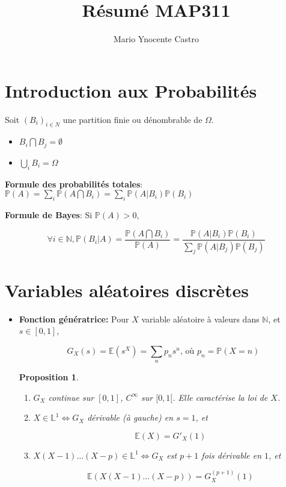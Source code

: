 \documentclass[10pt,a4paper,oneside]{article}
\newtheorem{proposition}{Proposition}
\begin{document}
\title{Résumé MAP311}
\author{Mario Ynocente Castro}

\maketitle

\section{Introduction aux Probabilités}

Soit $(B_i)_{i \in N}$ une partition finie ou dénombrable de $\Omega$.

\begin{itemize}
\item
$B_i \bigcap B_j = \emptyset$
\item
$\bigcup_i B_i = \Omega$
\end{itemize}

\textbf{Formule des probabilités totales}: $\mathbb{P}(A) = \sum_i \mathbb{P}(A \bigcap B_i) = \sum_i \mathbb{P}(A|B_i) \mathbb{P}(B_i)$

\textbf{Formule de Bayes}: Si $\mathbb{P}(A) > 0$,

\[ \forall i \in \mathbb{N}, \mathbb{P}(B_i|A) = \frac{\mathbb{P}(A \bigcap B_i)}{\mathbb{P}(A)} = \frac{\mathbb{P}(A|B_i)\mathbb{P}(B_i)}{\sum_j \mathbb{P}(A|B_j)\mathbb{P}(B_j)} \]

\section{Variables aléatoires discrètes}

\begin{itemize}
\item
\textbf{Fonction génératrice:} Pour $X$ variable aléatoire à valeurs dans $\mathbb{N}$, et $s \in [0,1]$,

\[ G_X(s) = \mathbb{E}(s^X) = \sum_{n} p_n s^n\text{, où }p_n = \mathbb{P}(X = n) \]

\begin{proposition}

\begin{enumerate}
\item
$G_X$ continue sur $[0,1]$, $C^\infty$ sur $[0,1[$. Elle caractérise la loi de $X$.

\item
$X \in \mathbb{L}^1 \Leftrightarrow G_X$ dérivable (à gauche) en $s = 1$, et

\[ \mathbb{E}(X) = G'_X(1) \]

\item
$X(X - 1)\ldots(X - p) \in \mathbb{L}^1 \Leftrightarrow G_X$ est $p + 1$ fois dérivable en $1$, et

\[ \mathbb{E}(X(X - 1)\ldots(X - p)) = G_X^{(p + 1)}(1) \]
\end{enumerate}

\end{proposition}

\end{itemize}
\end{document}
